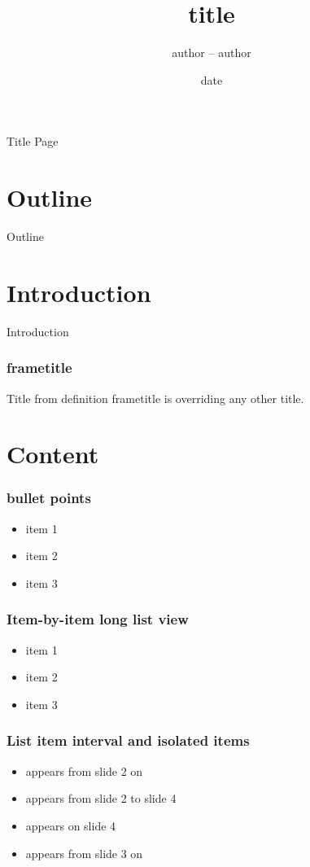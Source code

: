 \documentclass{Beamer}
\title[substitute tile for the page bottom]{title}
\author{author -- author}
\institute{institute}
\date{date}
\begin{document}
\begin{frame}[label=titlepage]{Title Page}
  \titlepage
\end{frame}

\section{Outline}
\begin{frame}{Outline}
  \tableofcontents
\end{frame}

\section{Introduction}
\begin{frame}{Introduction}
  \frametitle{frametitle}
  Title from definition frametitle is overriding any other title.
\end{frame}

\section{Content}

\begin{frame}
  \frametitle{bullet points}
  \begin{itemize}
  \item item 1
  \item item 2
  \item item 3
  \end{itemize}
\end{frame}

\begin{frame}
  \frametitle{Item-by-item long list view}
  \begin{itemize}[<+->]
  \item item 1
  \item item 2
  \item item 3
  \end{itemize}
\end{frame}

\begin{frame}
  \frametitle{List item interval and isolated items}
  \begin{itemize}
  \item<2-> appears from slide 2 on
  \item<2-4> appears from slide 2 to slide 4
  \item<4> appears on slide 4
  \item<3-> appears from slide 3 on    
  \end{itemize}
\end{frame}
\end{document}
